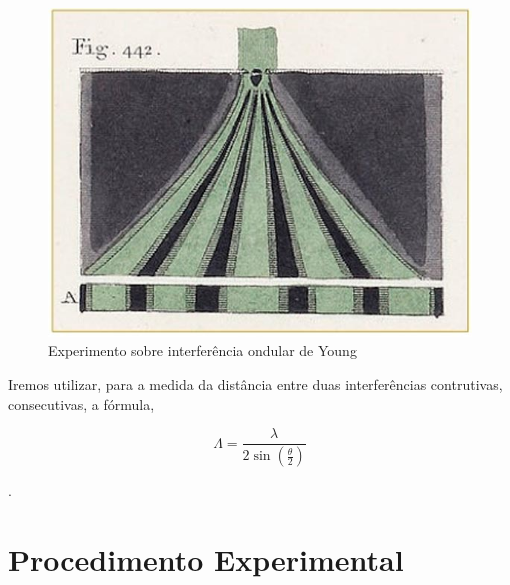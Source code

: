 \documentclass[
12pt,				%
openright,			%
oneside,			%
a4paper,			%
english,			%
french,				%
spanish,			%
brazil,				%
]{abntex2}
\begin{document}
\begin{figure}[!htb]
	\caption{\label{img:y1} Experimento sobre interferência ondular de Young}
	\begin{center}
	  \includegraphics[scale=0.3]{./imagens/y1.jpg}
	\end{center}
\end{figure}

Iremos utilizar, para a medida da distância entre duas interferências
contrutivas, consecutivas, a fórmula,

$$ \Lambda = \frac{\lambda}{2 \sin{(\frac{\theta}{2})}}
\label{eqn:Lambda}$$

\cite{ifsc2013}.

\chapter{Procedimento Experimental}
\end{document}
